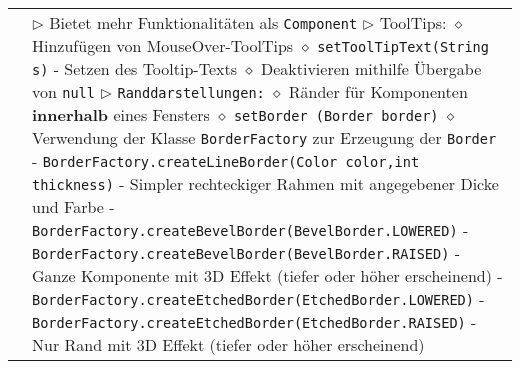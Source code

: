 \begin{longtable}{ | p{} p{} | }
	\makecell[l]{Klasse JComponent} & \makecell[l]{
	$\triangleright$ Bietet mehr Funktionalitäten als \texttt{Component} \\
	$\triangleright$ ToolTips: \\
	\hspace{0.4cm} $\diamond$ Hinzufügen von MouseOver-ToolTips \\
	\hspace{0.4cm} $\diamond$ \texttt{setToolTipText(String s)} \\
	\hspace{0.6cm} - Setzen des Tooltip-Texts \\
	\hspace{0.4cm} $\diamond$ Deaktivieren mithilfe Übergabe von \texttt{null} \\
	$\triangleright$ \texttt{Randdarstellungen:} \\
	\hspace{0.4cm} $\diamond$ Ränder für Komponenten \textbf{innerhalb} eines Fensters \\
	\hspace{0.4cm} $\diamond$ \texttt{setBorder (Border border)} \\
	\hspace{0.4cm} $\diamond$ Verwendung der Klasse \texttt{BorderFactory} zur Erzeugung der \texttt{Border} \\
	\hspace{0.6cm} - \texttt{BorderFactory.createLineBorder(Color color,int thickness)} \\
	\hspace{0.8cm} - Simpler rechteckiger Rahmen mit angegebener Dicke und Farbe \\
	\hspace{0.6cm} - \texttt{BorderFactory.createBevelBorder(BevelBorder.LOWERED)} \\
	\hspace{0.6cm} - \texttt{BorderFactory.createBevelBorder(BevelBorder.RAISED)} \\
	\hspace{0.8cm} - Ganze Komponente mit 3D Effekt (tiefer oder höher erscheinend) \\
	\hspace{0.6cm} - \texttt{BorderFactory.createEtchedBorder(EtchedBorder.LOWERED)} \\
	\hspace{0.6cm} - \texttt{BorderFactory.createEtchedBorder(EtchedBorder.RAISED)} \\
	\hspace{0.8cm} - Nur Rand mit 3D Effekt (tiefer oder höher erscheinend) \\
}
\end{longtable}

